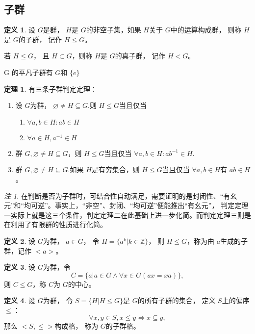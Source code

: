 \documentclass[a4paper,11pt]{article}%
\theoremstyle{remark}
\newtheorem*{remark}{注}
\theoremstyle{remark}
\theoremstyle{definition}
\newtheorem{theorem}{定理}[section]
\theoremstyle{definition}
\newtheorem*{definition}{定义}
\theoremstyle{plain}
\begin{document}
\subsection{子群}
\begin{definition}
    设 $G$是群， $H$是 $G$的非空子集，如果 $H$关于 $G$中的运算构成群， 则称 $H$ 是 $G$的子群， 记作 $H\leq G$。
    

    若 $H\leq G$， 且 $H\subset G$，则称 $H$是 $G$的真子群， 记作 $H<G$。
\end{definition}
 G 的平凡子群有 $G$和 $\{e\}$
\begin{theorem}
    有三条子群判定定理：
    \begin{enumerate}
        \item 设 $G$为群， $\varnothing\neq H\subseteq G.$则 $H \leq G$当且仅当
        \begin{enumerate}
            \item  $\forall a,b\in H:ab\in H$
            \item  $\forall a\in H, a^{-1}\in H$
        \end{enumerate}
        \item 群 $G,\varnothing\neq H\subseteq G$，则 $H\leq G$当且仅当 $\forall a,b\in H: ab^{-1}\in H$.
        \item 群 $G,\varnothing \neq H\subseteq G$.如果 $H$是有穷集合，则 $H\leq G$当且仅当 $\forall a,b\in H$有 $ab\in H$。
    \end{enumerate}
\end{theorem}
\begin{remark}
    在判断是否为子群时，可结合性自动满足，需要证明的是封闭性、“有幺元”和“均可逆”。事实上，“非空”、封闭、“均可逆”便能推出“有幺元”，
    判定定理一实际上就是这三个条件，判定定理二在此基础上进一步化简。而判定定理三则是在利用了有限群的性质进行化简。
\end{remark}
\begin{definition}
    设 $G$为群， $a\in G$， 令 $H=\{a^k|k\in \mathbb{Z}\}$， 则 $H\leq G$，称为由 $a$生成的子群，记作 $<a>$。
\end{definition}
\begin{definition}
    设 $G$为群，令
    \[C=\{a|a\in G\land \forall x\in G(ax=xa)\},\]
    则 $C\leq G$，称 $C$为 $G$的中心。
\end{definition}
\begin{definition}
    设 $G$为群， 令 $S=\{H|H\leq G\}$是 $G$的所有子群的集合， 定义 $S$上的偏序 $\leq$：
    \[\forall x,y\in S,x\leq y\Leftrightarrow x\subseteq y,\]
    那么 $<S,\leq>$构成格， 称为 $G$的子群格。
\end{definition}
\end{document}
